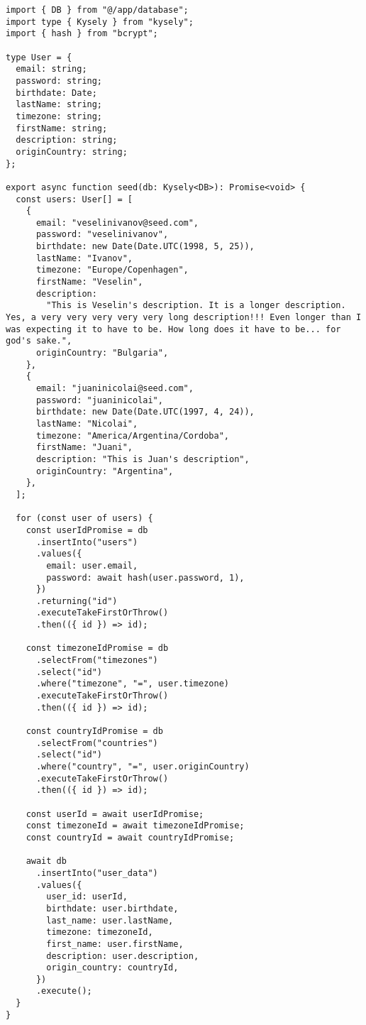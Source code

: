 \begin{verbatim}
import { DB } from "@/app/database";
import type { Kysely } from "kysely";
import { hash } from "bcrypt";

type User = {
  email: string;
  password: string;
  birthdate: Date;
  lastName: string;
  timezone: string;
  firstName: string;
  description: string;
  originCountry: string;
};

export async function seed(db: Kysely<DB>): Promise<void> {
  const users: User[] = [
    {
      email: "veselinivanov@seed.com",
      password: "veselinivanov",
      birthdate: new Date(Date.UTC(1998, 5, 25)),
      lastName: "Ivanov",
      timezone: "Europe/Copenhagen",
      firstName: "Veselin",
      description:
        "This is Veselin's description. It is a longer description. Yes, a very very very very very long description!!! Even longer than I was expecting it to have to be. How long does it have to be... for god's sake.",
      originCountry: "Bulgaria",
    },
    {
      email: "juaninicolai@seed.com",
      password: "juaninicolai",
      birthdate: new Date(Date.UTC(1997, 4, 24)),
      lastName: "Nicolai",
      timezone: "America/Argentina/Cordoba",
      firstName: "Juani",
      description: "This is Juan's description",
      originCountry: "Argentina",
    },
  ];

  for (const user of users) {
    const userIdPromise = db
      .insertInto("users")
      .values({
        email: user.email,
        password: await hash(user.password, 1),
      })
      .returning("id")
      .executeTakeFirstOrThrow()
      .then(({ id }) => id);

    const timezoneIdPromise = db
      .selectFrom("timezones")
      .select("id")
      .where("timezone", "=", user.timezone)
      .executeTakeFirstOrThrow()
      .then(({ id }) => id);

    const countryIdPromise = db
      .selectFrom("countries")
      .select("id")
      .where("country", "=", user.originCountry)
      .executeTakeFirstOrThrow()
      .then(({ id }) => id);

    const userId = await userIdPromise;
    const timezoneId = await timezoneIdPromise;
    const countryId = await countryIdPromise;

    await db
      .insertInto("user_data")
      .values({
        user_id: userId,
        birthdate: user.birthdate,
        last_name: user.lastName,
        timezone: timezoneId,
        first_name: user.firstName,
        description: user.description,
        origin_country: countryId,
      })
      .execute();
  }
}
\end{verbatim}

